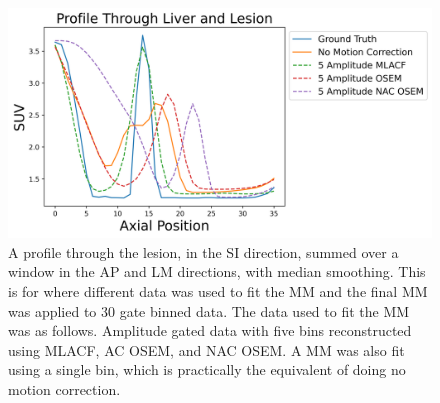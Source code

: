             \begin{figure}
                \centering
                
                \includegraphics[width=1.0\linewidth]{figures/motion_correction_2_results_2_5_amplitude_profile.png}
                
                \captionsetup{singlelinecheck=false}
                \caption{
                    A profile through the lesion, in the \gls{SI} direction, summed over a window in the \gls{AP} and \gls{LM} directions, with median smoothing. This is for where different data was used to fit the \gls{MM} and the final \gls{MM} was applied to $30$ gate binned data. The data used to fit the \gls{MM} was as follows. Amplitude gated data with five bins reconstructed using \gls{MLACF}, \gls{AC} \gls{OSEM}, and \gls{NAC} \gls{OSEM}. A \gls{MM} was also fit using a single bin, which is practically the equivalent of doing no motion correction.
                }
                
                \label{fig:evaluation_of_pet_ct_motion_correction_incorporating_motion_models_using_mlacf_and_complex_gating_schemes_results_5_amplitude_profile}
            \end{figure}

